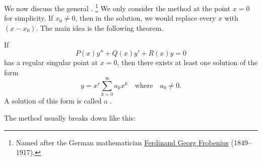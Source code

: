 We now discuss the general
\emph{}.%
\footnote{Named after the German mathematician
\href{http://en.wikipedia.org/wiki/Ferdinand_Georg_Frobenius}{Ferdinand
Georg Frobenius} (1849--1917).}
We only consider the method at the point $x=0$ for simplicity.
If $x_0 \neq 0$, then in the solution, we would replace every $x$ with $(x-x_0)$.
The main
idea is the following theorem.

\begin{theorem}
If
\begin{equation} \label{eq:frobeniusmethod}
P(x) y'' + Q(x) y' + R(x) y = 0
\end{equation}
has a regular singular point at $x=0$, then there exists at least
one solution of the form
\begin{equation*}
y = x^r \sum_{k=0}^\infty a_k x^k
\quad \text{where} \quad a_0 \neq 0.
\end{equation*}
A solution of this form is called a
\emph{}.
\end{theorem}

\pagebreak[2]
The method usually breaks down like this:

